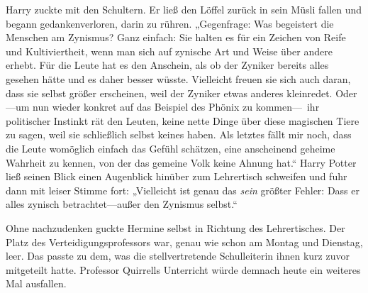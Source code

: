 Harry zuckte mit den Schultern. Er ließ den Löffel zurück in sein Müsli fallen und begann gedankenverloren, darin zu rühren. „Gegenfrage: Was begeistert die Menschen am Zynismus? Ganz einfach: Sie halten es für ein Zeichen von Reife und Kultiviertheit, wenn man sich auf zynische Art und Weise über andere erhebt. Für die Leute hat es den Anschein, als ob der Zyniker bereits alles gesehen hätte und es daher besser wüsste. Vielleicht freuen sie sich auch daran, dass sie selbst größer erscheinen, weil der Zyniker etwas anderes kleinredet.
Oder—um nun wieder konkret auf das Beispiel des Phönix zu kommen—~ihr politischer Instinkt rät den Leuten, keine nette Dinge über diese magischen Tiere zu sagen, weil sie schließlich selbst keines haben. Als letztes fällt mir noch, dass die Leute womöglich einfach das Gefühl schätzen, eine anscheinend geheime Wahrheit zu kennen, von der das gemeine Volk keine Ahnung hat.“
Harry Potter ließ seinen Blick einen Augenblick hinüber zum Lehrertisch schweifen und fuhr dann mit leiser Stimme fort: „Vielleicht ist genau das \emph{sein} größter Fehler: Dass er alles zynisch betrachtet—außer den Zynismus selbst.“

Ohne nachzudenken guckte Hermine selbst in Richtung des Lehrertisches. Der Platz des Verteidigungsprofessors war, genau wie schon am Montag und Dienstag, leer. Das passte zu dem, was die stellvertretende Schulleiterin ihnen kurz zuvor mitgeteilt hatte. Professor Quirrells Unterricht würde demnach heute ein weiteres Mal ausfallen.

